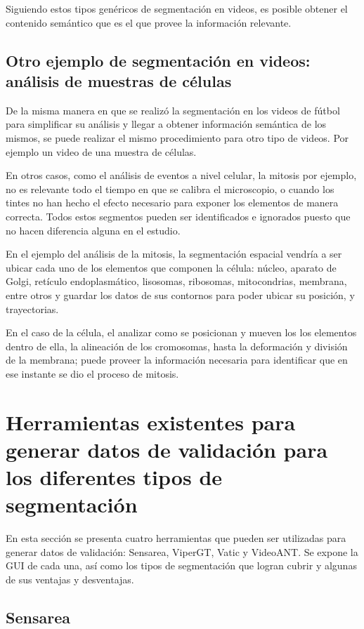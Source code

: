 Siguiendo estos tipos genéricos de segmentación en videos, es posible obtener el contenido semántico que es el que provee la información relevante.

\subsection{Otro ejemplo de segmentación en videos: análisis de muestras de células}

De la misma manera en que se realizó la segmentación en los videos de fútbol para simplificar su análisis y llegar a obtener información semántica de los mismos, se puede realizar el mismo procedimiento para otro tipo de videos. Por ejemplo un video de una muestra de células.


En otros casos, como el análisis de eventos a nivel celular, la mitosis por ejemplo, no es relevante todo el tiempo en que se calibra el microscopio, o cuando los tintes no han hecho el efecto necesario para exponer los elementos de manera correcta. Todos estos segmentos pueden ser identificados e ignorados puesto que no hacen diferencia alguna en el estudio.

En el ejemplo del análisis de la mitosis, la segmentación espacial vendría a ser ubicar cada uno de los elementos que componen la célula: núcleo, aparato de Golgi, retículo endoplasmático, lisosomas, ribosomas, mitocondrias, membrana, entre otros y guardar los datos de sus contornos para poder ubicar su posición, y trayectorias.


En el caso de la célula, el analizar como se posicionan y mueven los los elementos dentro de ella, la alineación de los cromosomas, hasta la deformación y división de la membrana; puede proveer la información necesaria para identificar que en ese instante se dio el proceso de mitosis.

\section{Herramientas existentes para generar datos de validación para los diferentes tipos de segmentación}

En esta sección se presenta cuatro herramientas que pueden ser utilizadas para generar datos de validación: Sensarea, ViperGT, Vatic y VideoANT. Se expone la GUI de cada una, así como los tipos de segmentación que logran cubrir y algunas de sus ventajas y desventajas.

\subsection{Sensarea}

